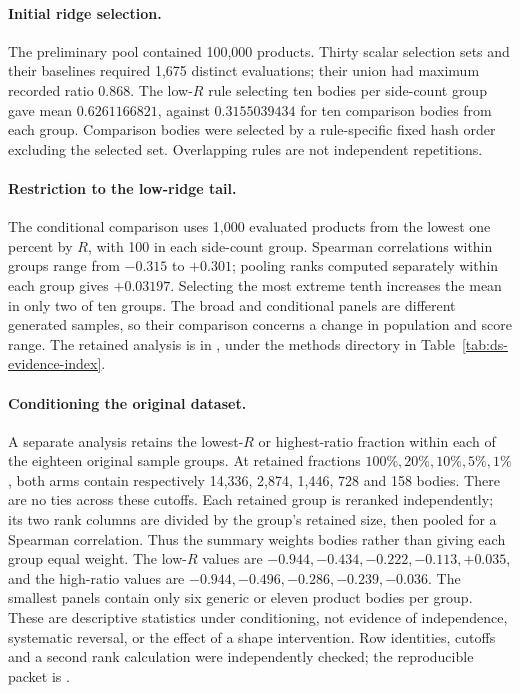 \paragraph{Initial ridge selection.}
The preliminary pool contained 100,000 products. Thirty scalar selection
sets and their baselines required 1,675 distinct evaluations; their union
had maximum recorded ratio $0.868$. The low-$R$ rule selecting ten bodies
per side-count group gave mean $0.6261166821$, against $0.3155039434$ for
ten comparison bodies from each group. Comparison bodies were selected by
a rule-specific fixed hash order excluding the selected set. Overlapping
rules are not independent repetitions.

\paragraph{Restriction to the low-ridge tail.}
The conditional comparison uses 1,000 evaluated products from the lowest
one percent by $R$, with 100 in each side-count group. Spearman
correlations within groups range from $-0.315$ to $+0.301$; pooling ranks
computed separately within each group gives $+0.03197$. Selecting the
most extreme tenth increases the mean in only two of ten groups. The
broad and conditional panels are different generated samples, so their
comparison concerns a change in population and score range. The retained
analysis is in ,
under the methods directory in Table~\ref{tab:ds-evidence-index}.

\paragraph{Conditioning the original dataset.}
A separate analysis retains the lowest-$R$ or highest-ratio fraction within
each of the eighteen original sample groups. At retained fractions
$100\%,20\%,10\%,5\%,1\%$, both arms contain respectively
14,336, 2,874, 1,446, 728 and 158 bodies. There are no ties across these
cutoffs. Each retained group is reranked independently; its two rank
columns are divided by the group's retained size, then pooled for a
Spearman correlation. Thus the summary weights bodies rather than giving
each group equal weight. The low-$R$ values are
$-0.944,-0.434,-0.222,-0.113,+0.035$, and the high-ratio values are
$-0.944,-0.496,-0.286,-0.239,-0.036$. The smallest panels contain only
six generic or eleven product bodies per group. These are descriptive
statistics under conditioning, not evidence of independence, systematic
reversal, or the effect of a shape intervention. Row identities, cutoffs
and a second rank calculation were independently checked; the reproducible
packet is .

